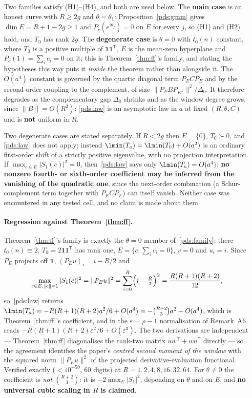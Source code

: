 Two families satisfy (H1)--(H4), and both are used below. The \textbf{main case} is an
honest curve with $R\ge2g$ and $\theta=\theta_1$: Proposition~\ref{pds:gram} gives
$\dim E=R+1-2g\ge1$ and $P_c(e^{i\theta_j})=0$ on $E$ for every $j$, so (H1) and (H2) hold,
and $T_0$ has rank $2g$. The \textbf{degenerate case} is $\theta=0$ with $t_0(n)$ constant,
where $T_0$ is a positive multiple of $\mathbf{1}\mathbf{1}^{\mathsf T}$, $E$ is the
mean-zero hyperplane and $P_c(1)=\sum_ic_i=0$ on it; this is Theorem~\ref{thm:ff}'s family,
and stating the hypotheses this way puts it \emph{inside} the theorem rather than alongside
it. The $O(a^{4})$ constant is governed by the quartic diagonal term $P_ECP_E$ and by the
second-order coupling to the complement, of size
$\|P_EBP_{E^{\perp}}\|^{2}/\Delta_0$. It therefore degrades as the complementary gap
$\Delta_0$ shrinks and as the window degree grows, since $\|B\|=O(R^{2})$:
\eqref{pds:law} is an asymptotic law in $a$ at fixed $(R,\theta,C)$ and is \textbf{not}
uniform in $R$.

Two degenerate cases are stated separately. If $R<2g$ then $E=\{0\}$, $T_0\succ0$, and
\eqref{pds:law} does not apply; instead $\lmin(T_a)=\lmin(T_0)+O(a^{2})$ is an ordinary
first-order shift of a strictly positive eigenvalue, with no projection interpretation. If
$\max_{c\in E}|S_1(c)|^{2}=0$, then~\eqref{pds:law} says only
$\lmin(T_a)=O(a^{4})$; \textbf{no nonzero fourth- or sixth-order coefficient may be
inferred from the vanishing of the quadratic one}, since the next-order combination (a
Schur-complement term together with $P_ECP_E$) can itself vanish. Neither case was
encountered in any tested cell, and no claim is made about them.

\paragraph{Regression against Theorem~\ref{thm:ff}.}
Theorem~\ref{thm:ff}'s family is exactly the $\theta=0$ member of~\eqref{pds:family}: there
$t_0(n)\equiv2$, $T_0=2\mathbf{1}\mathbf{1}^{\mathsf T}$ has rank one,
$E=\{c:\sum_ic_i=0\}$, $v=0$ and $u_i=i$. Since $P_E$ projects off $\mathbf 1$,
$(P_Eu)_i=i-R/2$ and
\[
\max_{c\in E,\|c\|=1}|S_1(c)|^{2}=\|P_Eu\|^{2}=\sum_{i=0}^{R}\Bigl(i-\tfrac R2\Bigr)^{2}
=\frac{R(R+1)(R+2)}{12},
\]
so~\eqref{pds:law} returns
$\lmin(T_a)=-R(R+1)(R+2)a^{2}/6+O(a^{4})=-\binom{R+2}{3}a^{2}+O(a^{4})$, which is
Theorem~\ref{thm:ff}'s coefficient, and in the $\varepsilon=\rho-1$ normalisation of
 Remark~A6 reads $-R(R+1)(R+2)\varepsilon^{2}/6+O(\varepsilon^{3})$.
The two derivations are independent --- Theorem~\ref{thm:ff} diagonalises the rank-two
matrix $uw^{\mathsf T}+wu^{\mathsf T}$ directly --- so the agreement identifies the paper's
\emph{centred second moment of the window} with the squared norm $\|P_Eu\|^{2}$ of the
projected derivative-evaluation functional. Verified exactly ($<10^{-50}$, $60$ digits) at
$R=1,2,4,8,16,32,64$. For $\theta\neq0$ the coefficient is \emph{not} $\binom{R+2}{3}$: it
is $-2\max_E|S_1|^{2}$, depending on $\theta$ and on $E$, and \textbf{no universal cubic
scaling in $R$ is claimed}.

